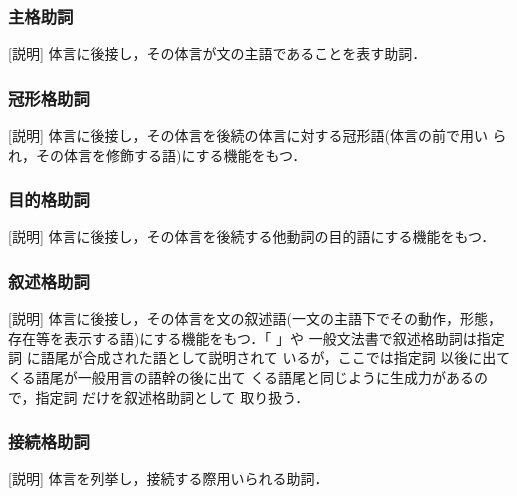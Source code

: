 \subsubsection{主格助詞}        
[説明] 体言に後接し，その体言が文の主語であることを表す助詞．


\subsubsection{冠形格助詞}        
[説明] 体言に後接し，その体言を後続の体言に対する冠形語(体言の前で用い
られ，その体言を修飾する語)にする機能をもつ． 
        

\subsubsection{目的格助詞}        
[説明] 体言に後接し，その体言を後続する他動詞の目的語にする機能をもつ．
        

\subsubsection{叙述格助詞}        
[説明] 体言に後接し，その体言を文の叙述語(一文の主語下でその動作，形態，
存在等を表示する語)にする機能をもつ．「
」\cite{国語大辞典}や
一般文法書で叙述格助詞は指定詞 
 に語尾が合成された語として説明されて
いるが，ここでは指定詞 
 以後に出てくる語尾が一般用言の語幹の後に出て
くる語尾と同じように生成力があるので，指定詞 
 だけを叙述格助詞として
取り扱う．


        
\subsubsection{接続格助詞}        
[説明] 体言を列挙し，接続する際用いられる助詞．

